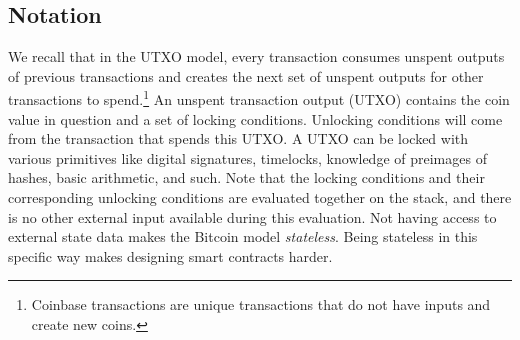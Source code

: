 \subsection{Notation}
We recall that in the UTXO model, every transaction consumes unspent outputs of previous transactions and creates the next set of unspent outputs for other transactions to spend.\footnote{Coinbase transactions are unique transactions that do not have inputs and create new coins.} An unspent transaction output (UTXO) contains the coin value in question and a set of locking conditions. Unlocking conditions will come from the transaction that spends this UTXO. A UTXO can be locked with various primitives like digital signatures, timelocks, knowledge of preimages of hashes, basic arithmetic, and such. Note that the locking conditions and their corresponding unlocking conditions are evaluated together on the stack, and there is no other external input available during this evaluation. Not having access to external state data makes the Bitcoin model \textit{stateless}. Being stateless in this specific way makes designing smart contracts harder.

